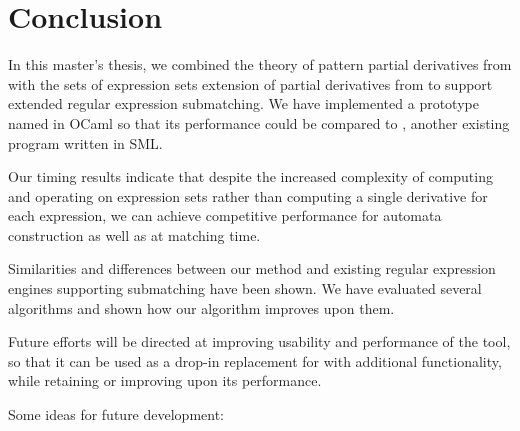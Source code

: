 \chapter{Conclusion}
\label{conclusion}

In this master's thesis, we combined the theory of pattern partial derivatives
from \cite{pdpat} with the sets of expression sets extension of partial
derivatives from \cite{pdere} to support extended regular expression
submatching. We have implemented a prototype named \dreml{} in OCaml so that its
performance could be compared to \mlulex, another existing program written in
SML.

Our timing results indicate that despite the increased complexity of computing
and operating on expression sets rather than computing a single derivative for
each expression, we can achieve competitive performance for automata
construction as well as at matching time.

Similarities and differences between our method and existing regular expression
engines supporting submatching have been shown. We have evaluated several
algorithms and shown how our algorithm improves upon them.

Future efforts will be directed at improving usability and performance of the
tool, so that it can be used as a drop-in replacement for \ocamllex{} with
additional functionality, while retaining or improving upon its performance.

Some ideas for future development:

